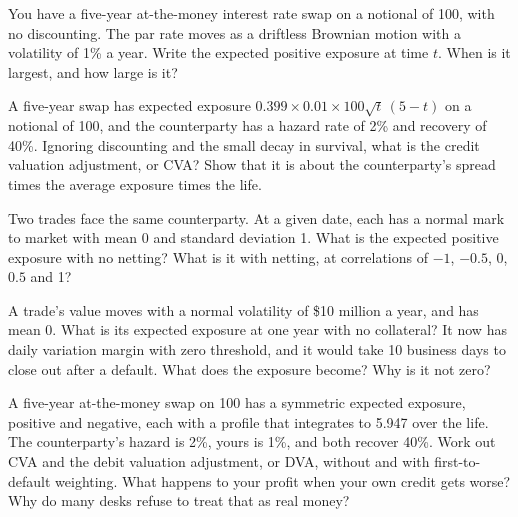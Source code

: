 \begin{question}\label{iq:iv2:credit-and-xva:10}
You have a five-year at-the-money interest rate swap on a notional of 100, with no discounting. The par rate moves as a driftless Brownian motion with a volatility of 1\% a year. Write the expected positive exposure at time $t$. When is it largest, and how large is it?
\end{question}

\begin{question}\label{iq:iv2:credit-and-xva:11}
A five-year swap has expected exposure $0.399 \times 0.01 \times 100 \sqrt{t}\,(5 - t)$ on a notional of 100, and the counterparty has a hazard rate of 2\% and recovery of 40\%. Ignoring discounting and the small decay in survival, what is the credit valuation adjustment, or CVA? Show that it is about the counterparty's spread times the average exposure times the life.
\end{question}

\begin{question}\label{iq:iv2:credit-and-xva:12}
Two trades face the same counterparty. At a given date, each has a normal mark to market with mean 0 and standard deviation 1. What is the expected positive exposure with no netting? What is it with netting, at correlations of $-1$, $-0.5$, 0, $0.5$ and 1?
\end{question}

\begin{question}\label{iq:iv2:credit-and-xva:13}
A trade's value moves with a normal volatility of \$10 million a year, and has mean 0. What is its expected exposure at one year with no collateral? It now has daily variation margin with zero threshold, and it would take 10 business days to close out after a default. What does the exposure become? Why is it not zero?
\end{question}

\begin{question}\label{iq:iv2:credit-and-xva:14}
A five-year at-the-money swap on 100 has a symmetric expected exposure, positive and negative, each with a profile that integrates to 5.947 over the life. The counterparty's hazard is 2\%, yours is 1\%, and both recover 40\%. Work out CVA and the debit valuation adjustment, or DVA, without and with first-to-default weighting. What happens to your profit when your own credit gets worse? Why do many desks refuse to treat that as real money?
\end{question}

